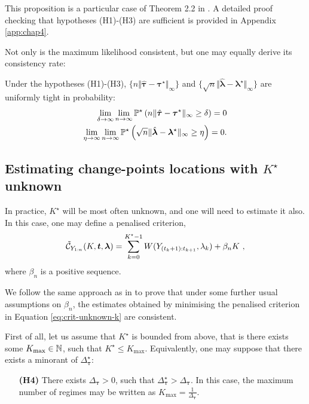 This proposition is a particular case of Theorem 2.2 in \cite{Lavielle1997}. A detailed proof checking that hypotheses (H1)-(H3) are sufficient is provided in Appendix \ref{app:chap4}. 

Not only is the maximum likelihood consistent, but one may equally derive its consistency rate: 

\begin{proposition}
Under the hypotheses (H1)-(H3), $\lbrace n\Vert \hat{\bm \tau} - \bm\tau^{\star}\Vert_{\infty}\rbrace$ and $\lbrace \sqrt n\Vert \hat{\bm \lambda} - \bm\lambda^{\star}\Vert_{\infty}\rbrace$ are uniformly tight in probability:
\begin{equation}\label{eq:ml-rate}
\begin{split}
  \lim_{\delta\rightarrow \infty} \lim_{n\rightarrow \infty} {\mathbb P}^{\star}\left( n\Vert \hat{\bm \tau} - \bm\tau^{\star}\Vert_{\infty} \ge \delta \right) = 0 \\
   \lim_{\eta \rightarrow \infty} \lim_{n\rightarrow \infty} {\mathbb P}^{\star}\left( \sqrt n\Vert \hat{\bm \lambda} - \bm\lambda^{\star}\Vert_{\infty} \ge \eta \right) = 0  .
  \end{split}
\end{equation}
\end{proposition}


\subsection{Estimating change-points locations with  \texorpdfstring{$K^{\star}$}{K*} unknown}

In practice, $K^{\star}$ will be most often unknown, and one will need to estimate it also. In this case, one may define a penalised criterion, 
\begin{equation}\label{eq:crit-unknown-k}
 \tilde {{\mathcal C}}_{Y_{1:n}}(K, \bm t, \bm \lambda ) = \sum_{k=0}^{K^{\star}-1}W(Y_{(t_{k}+1) : t_{k+1}}, \lambda_{k}) + \beta_{n}K \ , 
\end{equation}
where $\beta_{n}$ is a positive sequence.

We follow the same approach as  in \cite{Lavielle1997} to prove that under some further usual assumptions on $\beta_{n}$, the estimates obtained by minimising the penalised criterion in Equation \ref{eq:crit-unknown-k} are consistent. 

First of all, let us assume that $K^{\star}$ is bounded from above, that is there exists some $K_{\max}\in {\mathbb N}$, such that $K^{\star} \le K_{\max}$. Equivalently, one may suppose that there exists a minorant of $\Delta_{\bm \tau}^{\star}$:
\begin{itemize}
\item[\textbf{(H4)}] There exists $\Delta_{\bm \tau}>0$, such that $\Delta_{\bm \tau}^{\star} > \Delta_{\bm \tau}$. In this case, the maximum number of regimes may be written as $K_{\max} = \frac{1}{\Delta_{\bm \tau}}$. 
\end{itemize}

